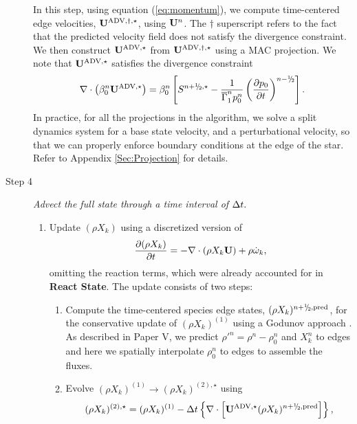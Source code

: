 \begin{description}
In this step, using equation (\ref{eq:momentum}), 
we compute time-centered edge velocities, ${\bf{U}}^{\mathrm{ADV},\dagger,\star}$, using
${\bf{U}}^n$.  The $\dagger$ superscript refers to the
fact that the predicted velocity field does not satisfy the divergence
constraint.  We then construct ${\bf{U}}^{\mathrm{ADV},\star}$ from ${\bf{U}}^{\mathrm{ADV},\dagger,\star}$
using a MAC projection.
We note that ${\bf{U}}^{\mathrm{ADV},\star}$ satisfies the divergence constraint
\begin{equation}
\nabla \cdot \left(\beta_0^n \uadvone\right) = \beta_0^n \left[S^{\nph,\star} - \frac{1}{\gammaonebar^np_0^n}\left(\frac{\partial p_0}{\partial t}\right)^{n-\myhalf} \right].\label{eq:div1}
\end{equation}
In practice, for all the projections in the algorithm, we solve a split dynamics
system for a base state velocity, and a perturbational velocity, so that we can properly
enforce boundary conditions at the edge of the star.
Refer to Appendix \ref{Sec:Projection} for details.

\item[Step 4] {\em Advect the full state through a time interval of $\Delta t.$}

\begin{enumerate}
\renewcommand{\theenumi}{{\bf \Alph{enumi}}}

\item Update $(\rho X_k)$ using a discretized version of
%
\begin{equation}
\frac{\partial(\rho X_k)}{\partial t} = -\nabla\cdot(\rho X_k\Ub) + \rho\omegadot_k,
\end{equation}
%
omitting the reaction terms, which were already
accounted for in {\bf React State}.  The update consists of two steps:

\begin{enumerate}
\renewcommand{\labelenumii}{{\bf \roman{enumii}}.}

\item Compute the time-centered species edge states, $(\rho X_k)^{\nph,\pred}$,
  for the conservative update of $(\rho X_k)^{(1)}$ using a Godunov approach \citep{XRB_III}.
  As described in Paper V, we predict $\rho'^n=\rho^n-\rho_0^n$ and $X_k^n$ to edges
  and here we spatially interpolate $\rho_0^n$ to edges to assemble the fluxes.

\item Evolve $(\rho X_k)^{(1)} \rightarrow (\rho X_k)^{(2),\star}$ using
\begin{equation}
(\rho X_k)^{(2),\star} = (\rho X_k)^{(1)}
  - \dt \left\{ \nabla \cdot \left[ \uadvone (\rho X_k)^{\nph,\pred} \right] \right\},
\end{equation}


\end{enumerate}
\end{enumerate}
\end{description}
